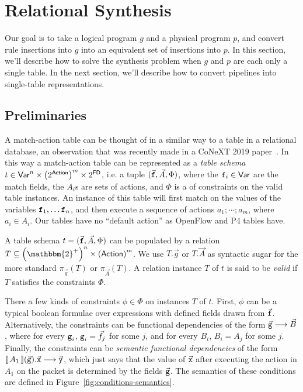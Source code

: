 \section{Relational Synthesis}

Our goal is to take a logical program $g$ and a physical program $p$,
and convert rule insertions into $g$ into an equivalent set of
insertions into $p$. In this section, we'll describe how to solve the
synthesis problem when $g$ and $p$ are each only a single table. In
the next section, we'll describe how to convert pipelines into
single-table representations.

\subsection{Preliminaries}
A match-action table can be thought of in a similar way to a table in
a relational database, an observation that was recently made in a
CoNeXT 2019 paper~\cite{Chiesa}. In this way a match-action table can
be represented as a \emph{table schema}
$t \in \mathsf{Var}^n \times \left(2^{\mathsf{Action}}\right)^m \times
2^{\mathsf{FD}}$, i.e. a tuple $(\vec{\texttt{f}}, \vec{A}, \Phi)$, where the
$\texttt{f}_i \in \mathsf{Var}$ are the match fields, the $A_i$s are sets of
actions, and $\Phi$ is a of constraints on the valid table
instances. An instance of this table will first match on the values of
the variables $\texttt{f}_1, \ldots \texttt{f}_n$, and then execute a sequence
of actions $a_1;\cdots;a_m$, where $a_i \in A_i$. Our tables have no
``default action'' as OpenFlow and P4 tables have.

A table schema $t = (\vec{\texttt{f}}, \vec{A}, \Phi)$ can be populated by
a relation
$T \subseteq \left(\mathbbm {2}^+\right)^n \times
\left(\mathsf{Action}\right)^m$. We use $T.\vec g$ or $T.\vec A$ as
syntactic sugar for the more standard $\pi_{\vec g}(T)$ or
$\pi_{\vec A}(T)$. A relation instance $T$ of $t$ is said to be
\emph{valid} if $T$ satisfies the constraints $\Phi$.

There a few kinds of constraints $ \phi \in \Phi$ on instances $T$ of
$t$. First, $\phi$ can be a typical boolean formulae over expressions
with defined fields drawn from $\vec{\texttt{f}}$. Alternatively, the
constraints can be functional dependencies of the form
$\vec{\texttt{g}} \longrightarrow \vec{B}$, where for every $\texttt{g}_i$,
$\texttt{g}_i = \vec f_j$ for some $j$, and for every $B_i$, $B_i = A_j$
for some $j$. Finally, the constraints can be \emph{semantic
  functional dependencies} of the form
$\llbracket\,A_1\,\rrbracket(\vec{\texttt{g}}).\vec{\texttt{x}} \longrightarrow \vec{\texttt{y}}$, which just says that the value of $\vec{\texttt{x}}$ after
executing the action in $A_1$ on the packet is determined by the
fields $\vec{\texttt{g}}$. The semantics of these conditions are defined
in Figure~\ref{fig:conditions-semantics}.

